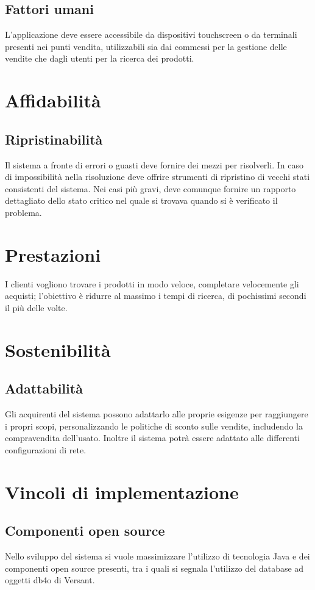 \documentclass[a4paper,10pt]{report}
\begin{document}
 \subsection*{Fattori umani}
L'applicazione deve essere accessibile da dispositivi touchscreen o da terminali presenti nei punti vendita, utilizzabili sia dai commessi per la gestione delle vendite che dagli utenti per la ricerca dei prodotti.

 \section*{Affidabilità}
 \subsection*{Ripristinabilità}
Il sistema a fronte di errori o guasti deve fornire dei mezzi per risolverli. In caso di impossibilità nella risoluzione deve offrire strumenti di ripristino di vecchi stati consistenti del sistema. Nei casi più gravi, deve comunque fornire un rapporto dettagliato dello stato critico nel quale si trovava quando si è verificato il problema.

 \section*{Prestazioni}
I clienti vogliono trovare i prodotti in modo veloce, completare velocemente gli acquisti; l'obiettivo è ridurre al massimo i tempi di ricerca, di pochissimi secondi il più delle volte.

 \section*{Sostenibilità}
 \subsection*{Adattabilità}
Gli acquirenti del sistema possono adattarlo alle proprie esigenze per raggiungere i propri scopi, personalizzando le politiche di sconto sulle vendite, includendo la compravendita dell'usato. Inoltre il sistema potrà essere adattato alle differenti configurazioni di rete.


 \section*{Vincoli di implementazione}

 \subsection*{Componenti open source}
Nello sviluppo del sistema si vuole massimizzare l'utilizzo di tecnologia Java e dei componenti open source presenti, tra i quali si segnala l’utilizzo del database ad oggetti db4o di Versant.
\end{document}
